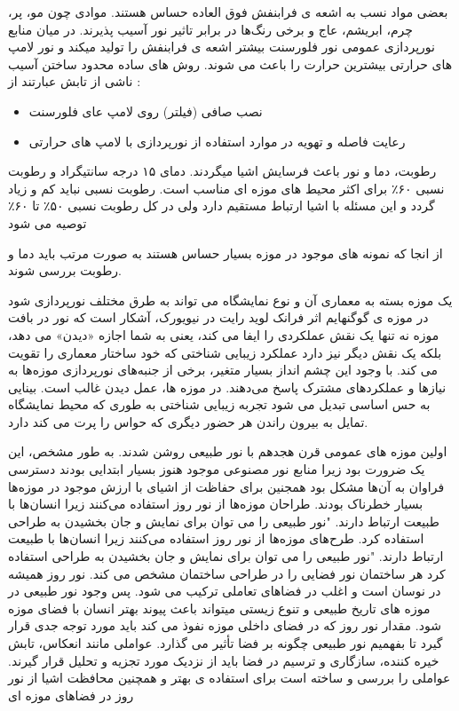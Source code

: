 بعضی مواد نسب به اشعه ی فرابنفش فوق العاده حساس هستند. موادی چون مو، پر، چرم، ابریشم، عاج و برخی رنگ‌ها در برابر تاثیر نور آسیب پذیرند. در میان منابع نورپردازی عمومی نور فلورسنت بیشتر اشعه ی فرابنفش را تولید میکند و نور لامپ های حرارتی بیشترین حرارت را باعث می شوند. روش های ساده محدود ساختن آسیب ناشی از تابش عبارتند از :
\begin{itemize}
    \item    نصب صافی (فیلتر) روی لامپ عای فلورسنت
    \item    رعایت فاصله و تهویه در موارد استفاده از نورپردازی با لامپ های حرارتی
\end{itemize}

رطوبت، دما و نور باعث فرسایش اشیا میگردند. دمای ۱۵ درجه سانتیگراد و رطوبت نسبی ۶۰٪ برای اکثر محیط های موزه ای مناسب است. رطوبت نسبی نباید کم و زیاد گردد و این مسئله با اشیا ارتباط مستقیم دارد ولی در کل رطوبت نسبی ۵۰٪ تا ۶۰٪ توصیه می شود

از انجا که نمونه های موجود در موزه بسیار حساس هستند به صورت مرتب باید دما و رطوبت بررسی شوند.

یک موزه بسته به معماری آن و نوع نمایشگاه می تواند به طرق مختلف نورپردازی شود
در موزه ی گوگنهایم اثر فرانک لوید رایت در نیویورک، آشکار است که نور در بافت موزه نه تنها یک نقش عملکردی را ایفا می کند، یعنی به شما اجازه «دیدن» می دهد، بلکه یک نقش دیگر نیز دارد عملکرد زیبایی شناختی که خود ساختار معماری را تقویت می کند. با وجود این چشم انداز بسیار متغیر، برخی از جنبه‌های نورپردازی موزه‌ها به نیازها و عملکردهای مشترک پاسخ می‌دهند. در موزه ها، عمل دیدن غالب است. بینایی به حس اساسی تبدیل می شود تجربه زیبایی شناختی به طوری که محیط نمایشگاه تمایل به بیرون راندن هر حضور دیگری که حواس را پرت می کند دارد.



اولین موزه های عمومی قرن هجدهم با نور طبیعی روشن شدند. به طور مشخص، این یک ضرورت بود زیرا منابع نور مصنوعی موجود هنوز بسیار ابتدایی بودند دسترسی فراوان به آن‌ها مشکل بود همجنین برای حفاظت از اشیای با ارزش موجود در موزه‌ها بسیار خطرناک بودند. 
طراحان موزه‌ها از نور روز استفاده می‌کنند زیرا انسان‌ها با طبیعت ارتباط دارند. "نور طبیعی را می توان برای نمایش و جان بخشیدن به طراحی استفاده کرد.
طرح‌های موزه‌ها از نور روز استفاده می‌کنند زیرا انسان‌ها با طبیعت ارتباط دارند. "نور طبیعی را می توان برای نمایش و جان بخشیدن به طراحی استفاده کرد هر ساختمان نور فضایی را در طراحی ساختمان مشخص می کند. نور روز همیشه در نوسان است و اغلب در فضاهای تعاملی ترکیب می شود.
پس وجود نور طبیعی در موزه های تاریخ طبیعی و تنوع زیستی میتواند باعث پیوند بهتر انسان با فضای موزه شود.
مقدار نور روز که در فضای داخلی موزه نفوذ می کند باید مورد توجه جدی قرار گیرد تا بفهمیم نور طبیعی چگونه بر فضا تأثیر می گذارد. عواملی مانند انعکاس، تابش خیره کننده، سازگاری و ترسیم در فضا باید از نزدیک مورد تجزیه و تحلیل قرار گیرند.  عواملی را بررسی و ساخته است برای استفاده ی بهتر و همچنین محافظت اشیا از نور روز در فضاهای موزه ای


